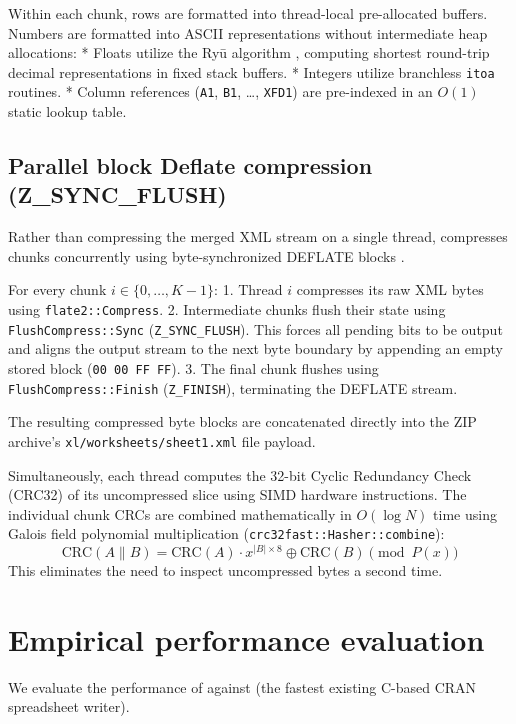 Within each chunk, rows are formatted into thread-local pre-allocated buffers. Numbers are formatted into ASCII representations without intermediate heap allocations:
* Floats utilize the Ryū algorithm \citep{adams2018ryu}, computing shortest round-trip decimal representations in fixed stack buffers.
* Integers utilize branchless \texttt{itoa} routines.
* Column references (\texttt{A1}, \texttt{B1}, \ldots, \texttt{XFD1}) are pre-indexed in an \(O(1)\) static lookup table.

\subsection{Parallel block Deflate compression (Z\_SYNC\_FLUSH)}\label{parallel-block-deflate-compression-z_sync_flush}

Rather than compressing the merged XML stream on a single thread,  compresses chunks concurrently using byte-synchronized DEFLATE blocks \citep{pigz, rfc1951}.

For every chunk \(i \in \{0, \dots, K-1\}\):
1. Thread \(i\) compresses its raw XML bytes using \texttt{flate2::Compress}.
2. Intermediate chunks flush their state using \texttt{FlushCompress::Sync} (\texttt{Z\_SYNC\_FLUSH}). This forces all pending bits to be output and aligns the output stream to the next byte boundary by appending an empty stored block (\texttt{00\ 00\ FF\ FF}).
3. The final chunk flushes using \texttt{FlushCompress::Finish} (\texttt{Z\_FINISH}), terminating the DEFLATE stream.

The resulting compressed byte blocks are concatenated directly into the ZIP archive's \texttt{xl/worksheets/sheet1.xml} file payload.

Simultaneously, each thread computes the 32-bit Cyclic Redundancy Check (CRC32) of its uncompressed slice using SIMD hardware instructions. The individual chunk CRCs are combined mathematically in \(O(\log N)\) time using Galois field polynomial multiplication (\texttt{crc32fast::Hasher::combine}):
\[\text{CRC}(A \parallel B) = \text{CRC}(A) \cdot x^{|B| \times 8} \oplus \text{CRC}(B) \pmod{P(x)}\]
This eliminates the need to inspect uncompressed bytes a second time.

\section{Empirical performance evaluation}\label{empirical-performance-evaluation}

We evaluate the performance of  against  (the fastest existing C-based CRAN spreadsheet writer).

